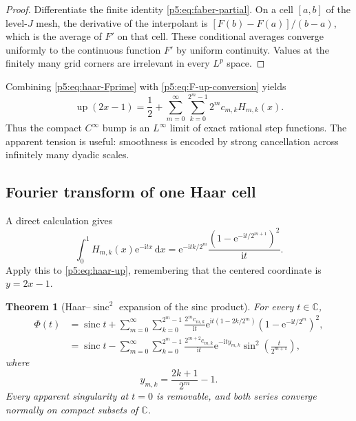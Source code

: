 \documentclass[11pt,oneside]{article}
\newtheorem{theorem}{Theorem}[section]
\theoremstyle{definition}
\newcommand{\dd}{\,\mathrm d}
\newcommand{\e}{\mathrm e}
\newcommand{\ii}{\mathrm i}
\newcommand{\C}{\mathbb C}
\newcommand{\Up}{\operatorname{up}}
\newcommand{\sinc}{\operatorname{sinc}}
\begin{document}
\begin{proof}
Differentiate the finite identity \eqref{p5:eq:faber-partial}.  On a cell
$[a,b]$ of the level-$J$ mesh, the derivative of the interpolant is
$[F(b)-F(a)]/(b-a)$, which is the average of $F'$ on that cell.  These
conditional averages converge uniformly to the continuous function $F'$ by
uniform continuity.  Values at the finitely many grid corners are irrelevant
in every $L^p$ space.
\end{proof}

Combining \eqref{p5:eq:haar-Fprime} with \eqref{p5:eq:F-up-conversion} yields
\begin{equation}
 \boxed{\displaystyle
 \Up(2x-1)=\frac12+
 \sum_{m=0}^\infty\sum_{k=0}^{2^m-1}
 2^m c_{m,k}H_{m,k}(x).}                                 \label{p5:eq:haar-up}
\end{equation}
Thus the compact $C^\infty$ bump is an $L^\infty$ limit of exact rational
step functions.  The apparent tension is useful: smoothness is encoded by
strong cancellation across infinitely many dyadic scales.

\subsection{Fourier transform of one Haar cell}

A direct calculation gives
\begin{equation}
 \int_0^1H_{m,k}(x)\e^{-\ii tx}\dd x
 =\e^{-\ii tk/2^m}
   \frac{(1-\e^{-\ii t/2^{m+1}})^2}{\ii t}.              \label{p5:eq:haar-transform}
\end{equation}
Apply this to \eqref{p5:eq:haar-up}, remembering that the centered coordinate is
$y=2x-1$.

\begin{theorem}[Haar--$\sinc^2$ expansion of the sinc product]
\label{p5:thm:haar-Phi}
For every $t\in\C$,
\begin{align}
 \Phi(t)
 &=\sinc t+
 \sum_{m=0}^\infty\sum_{k=0}^{2^m-1}
 \frac{2^m c_{m,k}}{\ii t}
 \e^{\ii t(1-2k/2^m)}
 \left(1-\e^{-\ii t/2^m}\right)^2,                     \label{p5:eq:haar-Phi-complex}\\
 &=\sinc t-
 \sum_{m=0}^\infty\sum_{k=0}^{2^m-1}
 \frac{2^{m+2}c_{m,k}}{\ii t}
 \e^{-\ii t y_{m,k}}
 \sin^2\!\left(\frac{t}{2^{m+1}}\right),              \label{p5:eq:haar-Phi-centered}
\end{align}
where
\begin{equation}
 y_{m,k}=\frac{2k+1}{2^m}-1.                             \label{p5:eq:haar-center-y}
\end{equation}
Every apparent singularity at $t=0$ is removable, and both series converge
normally on compact subsets of $\C$.
\end{theorem}
\end{document}
